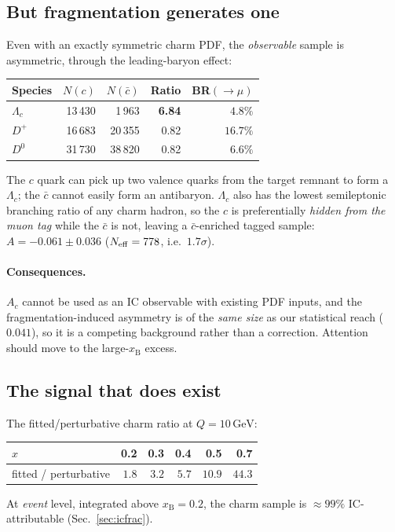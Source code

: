 \documentclass[11pt,a4paper]{article}
\newcommand{\xB}{x_{\mathrm{B}}}
\newcommand{\GeV}{\,\mathrm{GeV}}
\begin{document}
\subsection{But fragmentation generates one}
Even with an exactly symmetric charm PDF, the \emph{observable} sample is
asymmetric, through the leading-baryon effect:
\begin{center}\small
\begin{tabular}{lrrrr}
\toprule
Species & $N(c)$ & $N(\bar{c})$ & Ratio & BR$(\to\mu)$ \\
\midrule
$\Lambda_c$ & 13\,430 & 1\,963 & \textbf{6.84} & $4.8\%$ \\
$D^+$ & 16\,683 & 20\,355 & 0.82 & $16.7\%$ \\
$D^0$ & 31\,730 & 38\,820 & 0.82 & $6.6\%$ \\
\bottomrule
\end{tabular}
\end{center}
The $c$ quark can pick up two valence quarks from the target remnant to form a
$\Lambda_c$; the $\bar{c}$ cannot easily form an antibaryon. $\Lambda_c$ also has
the lowest semileptonic branching ratio of any charm hadron, so the $c$ is
preferentially \emph{hidden from the muon tag} while the $\bar{c}$ is not,
leaving a $\bar{c}$-enriched tagged sample: $A=-0.061\pm0.036$
($N_{\rm eff}=778$, i.e.\ $1.7\sigma$).

\paragraph{Consequences.} $A_c$ cannot be used as an IC observable with existing
PDF inputs, and the fragmentation-induced asymmetry is of the \emph{same size} as
our statistical reach ($0.041$), so it is a competing background rather than a
correction. Attention should move to the large-$\xB$ excess.

\subsection{The signal that does exist}
The fitted/perturbative charm ratio at $Q=10\GeV$:
\begin{center}\small
\begin{tabular}{lrrrrr}
\toprule
$x$ & 0.2 & 0.3 & 0.4 & 0.5 & 0.7 \\
\midrule
fitted / perturbative & $1.8$ & $3.2$ & $5.7$ & $10.9$ & $44.3$ \\
\bottomrule
\end{tabular}
\end{center}
At \emph{event} level, integrated above $\xB=0.2$, the charm sample is
$\approx99\%$ IC-attributable (Sec.~\ref{sec:icfrac}).
\end{document}
